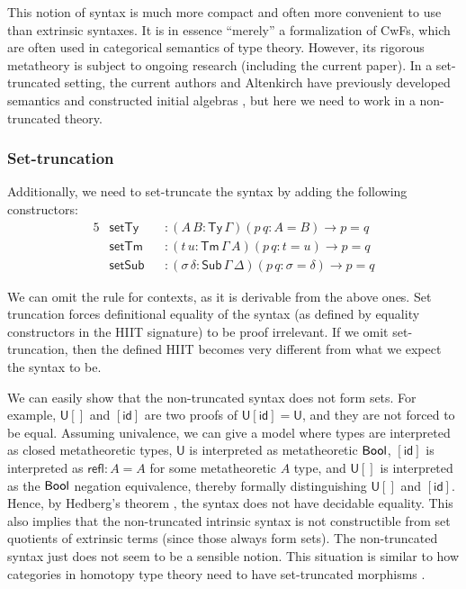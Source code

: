 \documentclass[dvipsnames]{lmcs} %
\newcommand{\U}{\mathsf{U}}
\newcommand{\ra}{\rightarrow}
\newcommand{\Ty}{\mathsf{Ty}}
\newcommand{\Tm}{\mathsf{Tm}}
\newcommand{\Sub}{\mathsf{Sub}}
\newcommand{\id}{\mathsf{id}}
\newcommand{\refl}{\mathsf{refl}}
\newcommand{\1}{\mathsf{1}} \renewcommand{\Pr}{\mathsf{Pr}}
\theoremstyle{plain}\newtheorem{satz}[thm]{Satz} %
\begin{document}
This notion of syntax is much more compact and often more convenient to use
than extrinsic syntaxes. It is in essence ``merely'' a formalization of CwFs,
which are often used in categorical semantics of type theory. However, its
rigorous metatheory is subject to ongoing research (including the current
paper). In a set-truncated setting, the current authors and Altenkirch have
previously developed semantics and constructed initial algebras
\cite{kaposi2019constructing}, but here we need to work in a non-truncated
theory.

\subsubsection{Set-truncation}
Additionally, we need to set-truncate the syntax by adding the following constructors:
\begin{alignat*}{5}
  & \mathsf{setTy}  && : (A\,B : \Ty\,\Gamma)(p\,q : A = B)\ra p = q \\
  & \mathsf{setTm}  && : (t\,u : \Tm\,\Gamma\,A)(p\,q : t = u)\ra p = q \\
  & \mathsf{setSub} && : (\sigma\,\delta : \Sub\,\Gamma\,\Delta)(p\,q : \sigma = \delta)\ra p = q
\end{alignat*}

\noindent We can omit the rule for contexts, as it is derivable from the above ones. Set
truncation forces definitional equality of the syntax (as defined by equality
constructors in the HIIT signature) to be proof irrelevant. If we omit
set-truncation, then the defined HIIT becomes very different from what we expect
the syntax to be.

We can easily show that the non-truncated syntax does not form sets. For
example, $\U[]$ and $[\id]$ are two proofs of $\U[\id] = \U$, and they are not
forced to be equal. Assuming univalence, we can give a model where types are
interpreted as closed metatheoretic types, $\U$ is interpreted as metatheoretic
$\mathsf{Bool}$, $[\id]$ is interpreted as $\refl : A = A$ for some metatheoretic $A$
type, and $\U[]$ is interpreted as the $\mathsf{Bool}$ negation equivalence, thereby
formally distinguishing $\U[]$ and $[\id]$. Hence, by Hedberg's theorem
\cite{hedberg}, the syntax does not have decidable equality. This also implies
that the non-truncated intrinsic syntax is not constructible from set quotients
of extrinsic terms (since those always form sets). The non-truncated syntax just
does not seem to be a sensible notion. This situation is similar to how
categories in homotopy type theory need to have set-truncated morphisms
\cite{ahrens2015univalent}.
\end{document}
